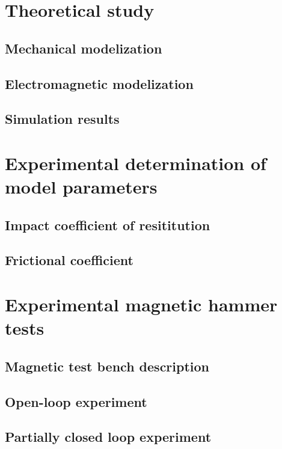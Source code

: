 \documentclass[letterpaper, 10 pt, conference]{ieeeconf}  %
\begin{document}
\section{Theoretical study}

\subsection{Mechanical modelization}

\subsection{Electromagnetic modelization}

\subsection{Simulation results}


\section{Experimental determination of model parameters}

\subsection{Impact coefficient of resititution}

\subsection{Frictional coefficient}

\section{Experimental magnetic hammer tests}

\subsection{Magnetic test bench description}

\subsection{Open-loop experiment}

\subsection{Partially closed loop experiment}
\end{document}

